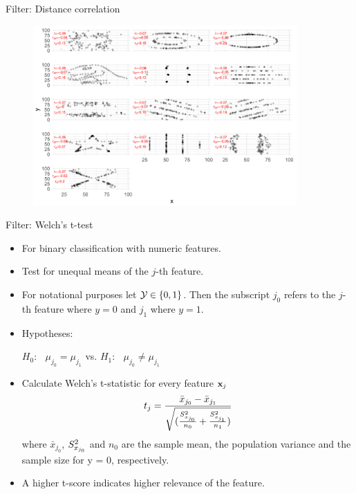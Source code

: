 \documentclass[11pt,compress,t,notes=noshow, xcolor=table]{beamer}
\begin{document}
\begin{vbframe}{Filter: Distance correlation}
  \begin{figure}
  \includegraphics[width = 0.9\textwidth]{figure_man/distance-corre.png}
  \end{figure}


  \end{vbframe}




  \begin{vbframe}{Filter: Welch's \MakeLowercase{t}-test}
  \begin{itemize}
    \item For binary classification with numeric features.
    \item Test for unequal means of the $j$-th feature.
    \item For notational purposes let $\mathcal{Y} \in \{ 0, 1\}$. Then the subscript $j_0$ refers to the $j$-th feature where $y = 0$ and $j_1$ where $y = 1$.
    \item Hypotheses:

    $H_0$: $\;\;\mu_{j_0} = \mu_{j_1} $ \qquad vs. \qquad $H_1$: $\;\;\mu_{j_0} \neq \mu_{j_1}$
    \item Calculate Welch's t-statistic for every feature $\mathbf{x}_j$
    $$ t_j = \frac{\bar{x}_{j_0} - \bar{x}_{j_1}}{\sqrt{(\frac{S^2_{x_{j_0}}}{n_0} + \frac{S^2_{x_{j_1}}}{n_1})}}$$
    where $\bar{x}_{j_0}$, $S^2_{x_{j_0}}$ and $n_0$ are the sample mean, the population variance and the sample size for y = 0, respectively.
    \item A higher t-score indicates higher relevance of the feature.
  \end{itemize}
  \end{vbframe}
\end{document}
